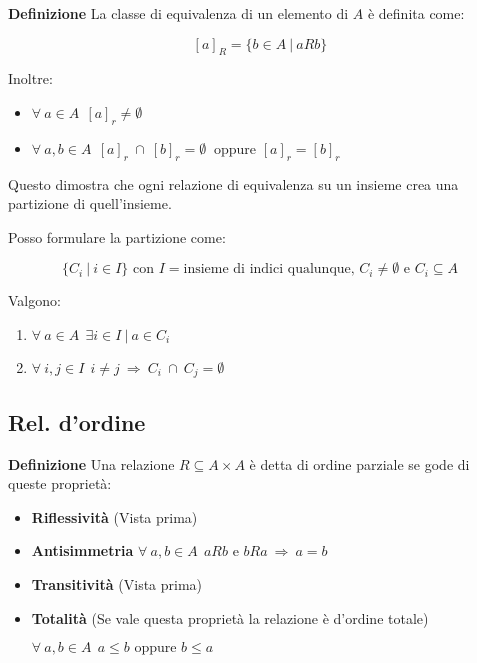\documentclass{article}
\begin{document}
\noindent\textbf{Definizione} La classe di equivalenza di un elemento di $A$ è definita come:

$$[a]_R=\{b\in A\ |\ aRb\}$$

\noindent Inoltre:
\begin{itemize}
    \item $\forall\ a\in A\ \ [a]_r\neq \emptyset$
    \item $\forall\ a,b\in A \ \ [a]_r\ \cap\ [b]_r = \emptyset\ \text{ oppure } [a]_r=[b]_r $
\end{itemize}

\noindent Questo dimostra che ogni relazione di equivalenza su un insieme crea una partizione di quell'insieme.\newline

\newpage

\noindent Posso formulare la partizione come:

$$\{C_i\ |\ i\in I\} \text{ con } I= \text{insieme di indici qualunque, } C_i\neq\emptyset \text{ e } C_i\subseteq A$$

\vspace{2pt}

\noindent Valgono:
\begin{enumerate}
    \item $\forall\ a\in A \ \ \exists i\in I\ |\ a\in C_i$
    \item $\forall \ i,j\in I\ \ i\neq j\ \Rightarrow\ C_i\ \cap\ C_j = \emptyset $
\end{enumerate}

\subsection{Rel. d'ordine}

\textbf{Definizione} Una relazione $R\subseteq A\times A$ è detta di ordine parziale se gode di queste proprietà:
\begin{itemize}
    \item \textbf{Riflessività} (Vista prima)
    \item \textbf{Antisimmetria} $\forall\ a,b\in A\ \ aRb  \text{ e } bRa\ \Rightarrow\ a=b$
    \item \textbf{Transitività} (Vista prima)
    \item \textbf{Totalità} (Se vale questa proprietà la relazione è d'ordine totale) 
    
    $\forall\ a,b\in A\ \ a\leq b \text{ oppure } b\leq a$\newline
\end{itemize}
\end{document}

